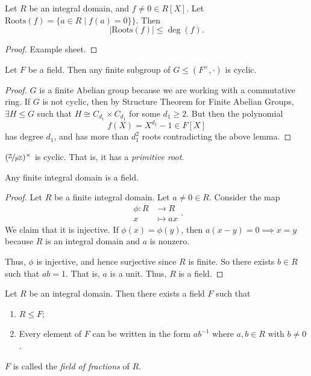 \leavevmode
\begin{lemma}
    Let \(R\) be an integral domain, and \(f \neq 0 \in R[X]\). Let \(\mathrm{Roots}(f)=\{a\in R \mid f(a) = 0\}\}\). Then
    \[
        \left\vert \mathrm{Roots}(f) \right\vert \leq \deg(f).
    \]
\end{lemma}
\begin{proof}
    Example sheet.
\end{proof}
\begin{theorem}
    Let \(F\) be a field. Then any finite subgroup of \(G \leq (F^\times, \cdot)\) is cyclic.
\end{theorem}
\begin{proof}
    \(G\) is a finite Abelian group because we are working with a commutative ring. If \(G\) is not cyclic, then by Structure Theorem for Finite Abelian Groups, \(\exists H \leq G\) such that \(H \cong C_{d_1}\times C_{d_1}\) for some \(d_1 \geq 2\). But then the polynomial
    \[
        f(X) = X^{d_1} - 1 \in F[X]
    \]
    has degree \(d_1\), and has more than \(d_1^2\) roots contradicting the above lemma.
\end{proof}
\begin{example}
    \((\nicefrac{\mathbb{Z}}{p\mathbb{Z}})^\times \) is cyclic. That is, it has a \textit{primitive root}.
\end{example}
\begin{proposition}
    Any finite integral domain is a field.
\end{proposition}
\begin{proof}
    Let \(R\) be a finite integral domain. Let \(a \neq 0 \in R\). Consider the map
    \[
    \begin{aligned}
      \phi\colon R & \longrightarrow R      \\
      x          & \longmapsto ax
    \end{aligned}.
    \]
    We claim that it is injective. If \(\phi(x) = \phi(y)\), then \(a(x-y) = 0 \implies x = y\) because \(R\) is an integral domain and \(a\) is nonzero.

    Thus, \(\phi\) is injective, and hence surjective since \(R\) is finite. So there exists \(b \in R\) such that \(ab = 1\). That is, \(a\) is a unit. Thus, \(R\) is a field.
\end{proof}
\begin{theorem}
    Let \(R\) be an integral domain. Then there exists a field \(F\) such that
    \begin{enumerate}
        \item \(R \leq F\);
        \item Every element of \(F\) can be written in the form \(a b^{-1}\) where \(a,b \in R\) with \(b \neq 0\).
    \end{enumerate}

    \(F\) is called the \textit{field of fractions} of \(R\).
\end{theorem}
